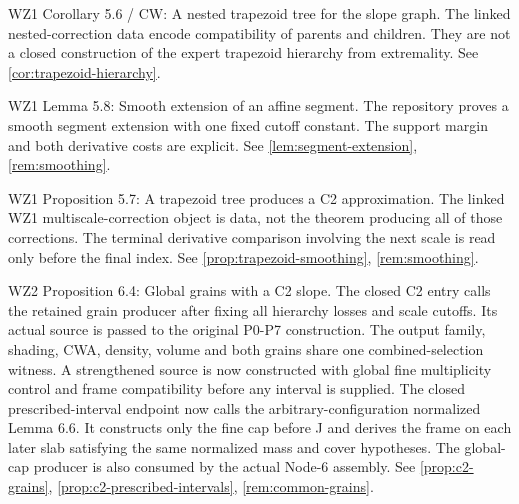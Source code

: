 \begin{remark}
\label{rem:atlas-C5_6}
WZ1 Corollary 5.6 / CW: A nested trapezoid tree for the slope graph.
The linked nested-correction data encode compatibility of parents and children. They are not a closed construction of the expert trapezoid hierarchy from extremality.
See \ref{cor:trapezoid-hierarchy}.
\end{remark}

\begin{remark}
\label{rem:atlas-L5_8}
WZ1 Lemma 5.8: Smooth extension of an affine segment.
The repository proves a smooth segment extension with one fixed cutoff constant. The support margin and both derivative costs are explicit.
See \ref{lem:segment-extension}, \ref{rem:smoothing}.
\end{remark}

\begin{remark}
\label{rem:atlas-P5_7}
WZ1 Proposition 5.7: A trapezoid tree produces a C2 approximation.
The linked WZ1 multiscale-correction object is data, not the theorem producing all of those corrections. The terminal derivative comparison involving the next scale is read only before the final index.
See \ref{prop:trapezoid-smoothing}, \ref{rem:smoothing}.
\end{remark}

\begin{remark}
\label{rem:atlas-W2P6_4}
WZ2 Proposition 6.4: Global grains with a C2 slope.
The closed C2 entry calls the retained grain producer after fixing all hierarchy losses and scale cutoffs. Its actual source is passed to the original P0-P7 construction. The output family, shading, CWA, density, volume and both grains share one combined-selection witness. A strengthened source is now constructed with global fine multiplicity control and frame compatibility before any interval is supplied. The closed prescribed-interval endpoint now calls the arbitrary-configuration normalized Lemma 6.6. It constructs only the fine cap before J and derives the frame on each later slab satisfying the same normalized mass and cover hypotheses. The global-cap producer is also consumed by the actual Node-6 assembly.
See \ref{prop:c2-grains}, \ref{prop:c2-prescribed-intervals}, \ref{rem:common-grains}.
\end{remark}

